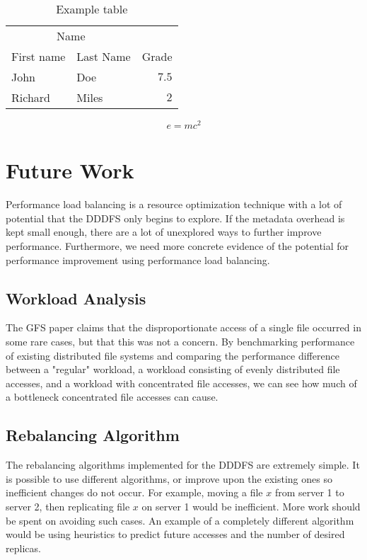 \documentclass[twoside]{article}
\begin{document}
\begin{multicols}{2}
\begin{table}[H]
\caption{Example table}
\centering
\begin{tabular}{llr}
\toprule
\multicolumn{2}{c}{Name} \\
\cmidrule(r){1-2}
First name & Last Name & Grade \\
\midrule
John & Doe & $7.5$ \\
Richard & Miles & $2$ \\
\bottomrule
\end{tabular}
\end{table}

\lipsum[5] %

\begin{equation}
\label{eq:emc}
e = mc^2
\end{equation}

\lipsum[6] %


\section{Future Work}

Performance load balancing is a resource optimization technique with a lot of potential that the DDDFS only begins to explore. If the metadata overhead is kept small enough, there are a lot of unexplored ways to further improve performance. Furthermore, we need more concrete evidence of the potential for performance improvement using performance load balancing.

\subsection*{Workload Analysis}
The GFS paper claims that the disproportionate access of a single file occurred in some rare cases, but that this was not a concern. By benchmarking performance of existing distributed file systems and comparing the performance difference between a "regular" workload, a workload consisting of evenly distributed file accesses, and a workload with concentrated file accesses, we can see how much of a bottleneck concentrated file accesses can cause.

\subsection*{Rebalancing Algorithm}
The rebalancing algorithms implemented for the DDDFS are extremely simple. It is possible to use different algorithms, or improve upon the existing ones so inefficient changes do not occur. For example, moving a file $x$ from server 1 to server 2, then replicating file $x$ on server 1 would be inefficient. More work should be spent on avoiding such cases. An example of a completely different algorithm would be using heuristics to predict future accesses and the number of desired replicas.


\end{multicols}
\end{document}
